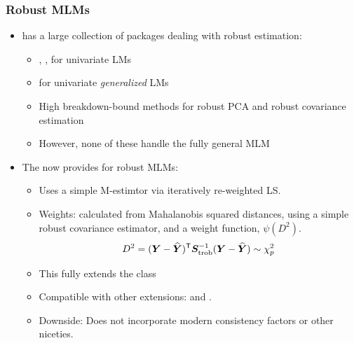 \begin{frame}
  \frametitle{Robust MLMs}

  \begin{itemize}
  \item {} has a large collection of packages dealing with robust estimation:
    \begin{itemize}
    \item {}, , for univariate LMs
    \item {} for univariate \emph{generalized} LMs
    \item \alert{High breakdown-bound} methods for robust PCA and robust covariance estimation
    \item However, none of these handle the \alert{fully general MLM}  
    \end{itemize}
  \item
    The  now provides  for robust MLMs:
    \begin{itemize}
    \item Uses a simple M-estimtor via iteratively re-weighted LS.
    \item Weights: calculated from Mahalanobis squared distances, using
    a simple robust covariance estimator, 
    and a weight function, $\psi (D^2)$.
    \[
    D^2 = (\bm{Y} - \widehat{\bm{Y}})^\mathsf{T} \bm{S}_{\mathrm{trob}}^{-1} (\bm{Y} - \widehat{\bm{Y}})
       \sim \chi^2_p
    \]
    \item This fully extends the  class
    \item Compatible with other   extensions:  and
			.
		\item Downside: Does not incorporate modern consistency factors or other
		niceties.
    \end{itemize}
  \end{itemize}
\end{frame}

